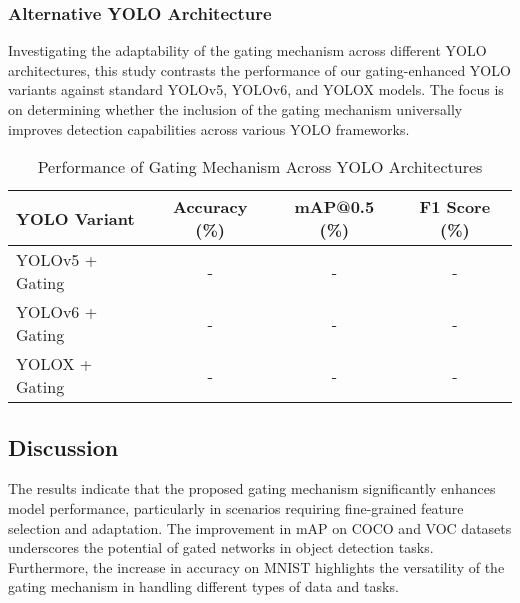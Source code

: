 \subsubsection{Alternative YOLO Architecture}

Investigating the adaptability of the gating mechanism across different YOLO architectures, this study contrasts the performance of our gating-enhanced YOLO variants against standard YOLOv5, YOLOv6, and YOLOX models. The focus is on determining whether the inclusion of the gating mechanism universally improves detection capabilities across various YOLO frameworks.

\begin{table}[ht]
\centering
\caption{Performance of Gating Mechanism Across YOLO Architectures}
\label{tab:yolo_architecture}
\begin{tabular}{@{}lccc@{}}
\toprule
YOLO Variant & Accuracy (\%) & mAP@0.5 (\%) & F1 Score (\%) \\ 
\midrule
YOLOv5 + Gating & - & - & - \\
YOLOv6 + Gating & - & - & - \\
YOLOX + Gating & - & - & - \\
\bottomrule
\end{tabular}
\end{table}

\subsection{Discussion}

The results indicate that the proposed gating mechanism significantly enhances model performance, particularly in scenarios requiring fine-grained feature selection and adaptation. The improvement in mAP on COCO and VOC datasets underscores the potential of gated networks in object detection tasks. Furthermore, the increase in accuracy on MNIST highlights the versatility of the gating mechanism in handling different types of data and tasks.

\clearpage
